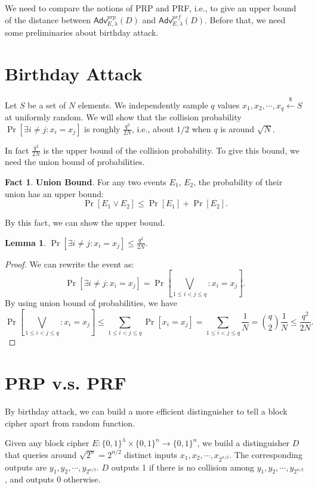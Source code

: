 \documentclass[12pt]{article}
\newcommand{\bits}{\{0,1\}}
\newcommand{\getsr}{\stackrel{\$}{\gets}}
\newcommand{\Adv}{\mathsf{Adv}}
\newtheorem{lemma}[theorem]{Lemma}
\theoremstyle{definition}
\newtheorem{fact}[theorem]{Fact}
\begin{document}
We need to compare the notions of PRP and PRF, i.e., to give an upper bound of the distance between $\Adv_{E,\lambda}^{prp}(D)$ and $\Adv_{E,\lambda}^{prf}(D)$. Before that, we need some preliminaries about birthday attack.

\section{Birthday Attack}
Let $S$ be a set of $N$ elements. We independently sample $q$ values $x_1, x_2, \cdots, x_q \getsr S$ at uniformly random. We will show that the collision probability $\Pr[\exists i\not= j : x_i = x_j]$ is roughly $\frac{q^2}{2N}$, i.e., about $1/2$ when $q$ is around $\sqrt{N}$.

In fact $\frac{q^2}{2N}$ is the upper bound of the collision probability. To give this bound, we need the union bound of probabilities.

\begin{fact}
{\bf Union Bound}. For any two events $E_1$, $E_2$, the probability of their union has an upper bound:
$$\Pr[E_1 \vee E_2] \leq \Pr[E_1] + \Pr[E_2].$$
\end{fact}

By this fact, we can show the upper bound.

\begin{lemma}
$\Pr[\exists i\not= j : x_i = x_j] \leq \frac{q^2}{2N}$.
\end{lemma}
\begin{proof}
We can rewrite the event as:
$$\Pr[\exists i\not= j : x_i = x_j] = \Pr[\bigvee_{1 \leq i < j \leq q} : x_i = x_j].$$
By using union bound of probabilities, we have
$$\Pr[\bigvee_{1 \leq i < j \leq q} : x_i = x_j] \leq \sum_{1\leq i < j \leq q}\Pr[x_i=x_j] = \sum_{1\leq i < j \leq q} \frac{1}{N} = \binom{q}{2} \frac{1}{N} \leq \frac{q^2}{2N}.$$
\end{proof}

\section{PRP v.s. PRF}
By birthday attack, we can build a more efficient distinguisher to tell a block cipher apart from random function. 

Given any block cipher $E : \bits^\lambda \times \bits^n \to \bits^n$, we build a distinguisher $D$ that queries around $\sqrt{2^n} = 2^{n/2}$ distinct inputs $x_1, x_2, \cdots, x_{2^{n/2}}$. The corresponding outputs are $y_1, y_2, \cdots, y_{2^{n/2}}$. $D$ outputs 1 if there is no collision among $y_1, y_2, \cdots, y_{2^{n/2}}$, and outputs 0 otherwise.
\end{document}
